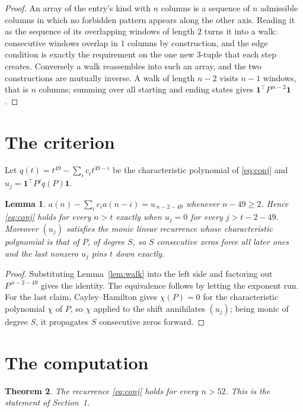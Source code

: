 \documentclass[11pt,a4paper]{article}
\theoremstyle{plain}
\newtheorem{theorem}{Theorem}
\newtheorem{lemma}[theorem]{Lemma}
\theoremstyle{definition}
\begin{document}
\begin{proof}
An array of the entry's kind with $n$ columns is a sequence of $n$ admissible columns in
which no forbidden pattern appears along the other axis. Reading it as the sequence of its
overlapping windows of length $2$ turns it into a walk: consecutive windows overlap in
$1$ columns by construction, and the edge condition is exactly the requirement on the one
new $3$-tuple that each step creates. Conversely a walk reassembles into such an array,
and the two constructions are mutually inverse. A walk of length $n-2$ visits $n-1$
windows, that is $n$ columns; summing over all starting and ending states gives
$\mathbf{1}^{\!\top}P^{\,n-2}\mathbf{1}$.
\end{proof}

\section{The criterion}

Let $q(t)=t^{49}-\sum_i c_i t^{49-i}$ be the characteristic polynomial of
\eqref{eq:conj} and $u_j=\mathbf{1}^{\!\top}P^{j}q(P)\mathbf{1}$.

\begin{lemma}\label{lem:crit}
$a(n)-\sum_i c_i a(n-i)=u_{\,n-2-49}$ whenever $n-49\ge2$. Hence
\eqref{eq:conj} holds for every $n>t$ exactly when $u_j=0$ for every
$j>t-2-49$. Moreover $(u_j)$ satisfies the monic linear recurrence whose
characteristic polynomial is that of $P$, of degree $S$, so $S$ consecutive zeros force all
later ones and the last nonzero $u_j$ pins $t$ down exactly.
\end{lemma}

\begin{proof}
Substituting Lemma~\ref{lem:walk} into the left side and factoring out
$P^{\,n-2-49}$ gives the identity. The equivalence follows by letting the exponent
run. For the last claim, Cayley--Hamilton gives $\chi(P)=0$ for the characteristic
polynomial $\chi$ of $P$, so $\chi$ applied to the shift annihilates $(u_j)$; being monic of
degree $S$, it propagates $S$ consecutive zeros forward.
\end{proof}

\section{The computation}

\begin{theorem}
The recurrence \eqref{eq:conj} holds for every $n>52$. This is the statement of
Section~1.
\end{theorem}
\end{document}
